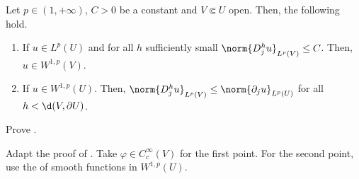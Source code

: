\documentclass[
    a4paper,
    DIV=14,
    abstract=true,
    numbers=noenddot
]{scrartcl}
\begin{document}
\begin{lemma}\label{difference quotients 2}
    Let $p \in (1, +\infty)$, $C>0$ be a constant and $V \Subset U$ open. Then, the following hold.
    \begin{enumerate}
        \item If $u \in L^p(U)$ and for all $h$ sufficiently small $\norm{D_j^h u}_{L^p(V)} \leq C$. Then, $u \in W^{1,p}(V)$.
        \item If $u \in W^{1,p}(U)$. Then, $\norm{D_j^h u}_{L^p(V)} \leq \norm{\partial_j u}_{L^p(U)}$ for all $h<\d(V,\partial U)$.
    \end{enumerate}
\end{lemma}
\begin{exercise}
    Prove .
\end{exercise}
\begin{hint}
    Adapt the proof of . Take $\varphi \in C_c^\infty(V)$ for the first point. For the second point, use the  of smooth functions in $W^{1,p}(U)$.
\end{hint}
\end{document}
